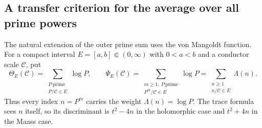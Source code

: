 \documentclass[12pt,reqno]{amsart}
\numberwithin{equation}{section}
\theoremstyle{plain}
\theoremstyle{definition}
\theoremstyle{remark}
\begin{document}
\subsection{A transfer criterion for the average over all prime powers}

The natural extension of the outer prime sum uses the von Mangoldt function.
For a compact interval $E=[a,b]\Subset(0,\infty)$ with $0<a<b$ and a conductor scale $\mathcal C$, put
\begin{equation}
\label{eqPrimeAndAllPowerMasses}
\Theta_E(\mathcal C)
=\sum_{\substack{P\ \mathrm{prime}\\ P/\mathcal C\in E}}\log P,
\qquad
\Psi_E(\mathcal C)
=\sum_{\substack{m\geq1,\ P\ \mathrm{prime}\\ P^m/\mathcal C\in E}}\log P
=\sum_{\substack{n\geq1\\ n/\mathcal C\in E}}\Lambda(n).
\end{equation}
Thus every index $n=P^m$ carries the weight $\Lambda(n)=\log P$.
The trace formula sees $n$ itself, so its discriminant is $t^2-4n$ in the holomorphic case and $t^2+4n$ in the Maass case.
\end{document}
